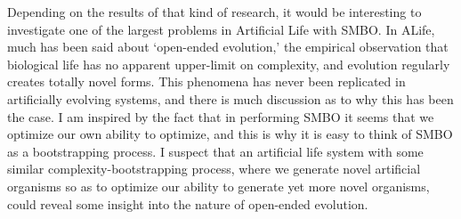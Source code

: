 Depending on the results of that kind of research, it would be interesting to investigate one of the largest problems in Artificial Life with SMBO. In ALife, much has been said about `open-ended evolution,' the empirical observation that biological life has no apparent upper-limit on complexity, and evolution regularly creates totally novel forms. This phenomena has never been replicated in artificially evolving systems, and there is much discussion as to why this has been the case. I am inspired by the fact that in performing SMBO it seems that we optimize our own ability to optimize, and this is why it is easy to think of SMBO as a bootstrapping process. I suspect that an artificial life system with some similar complexity-bootstrapping process, where we generate novel artificial organisms so as to optimize our ability to generate yet more novel organisms, could reveal some insight into the nature of open-ended evolution.




